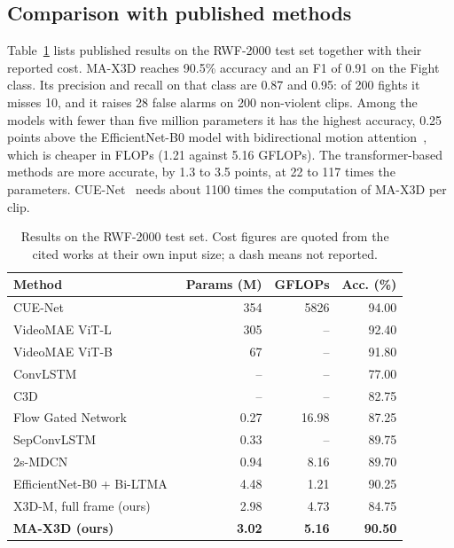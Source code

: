 \documentclass[conference]{IEEEtran}
\newif\ifdraft \drafttrue
\newcommand{\res}[1]{\ifdraft{\color{red}#1}\else#1\fi}
\begin{document}
\subsection{Comparison with published methods}

Table~\ref{tab:sota} lists published results on the RWF-2000 test set
together with their reported cost. MA-X3D reaches \res{90.5\%} accuracy
and an F1 of \res{0.91} on the Fight class. Its precision and recall on
that class are \res{0.87} and \res{0.95}: of 200 fights it misses
\res{10}, and it raises \res{28} false alarms on 200 non-violent clips.
Among the models with fewer than five million parameters it has the
highest accuracy, \res{0.25} points above the EfficientNet-B0 model with
bidirectional motion attention~\cite{biltma}, which is cheaper in FLOPs
(1.21 against 5.16 GFLOPs). The transformer-based methods are more
accurate, by \res{1.3} to \res{3.5} points, at 22 to 117 times the
parameters. CUE-Net~\cite{cuenet} needs about 1100 times the
computation of MA-X3D per clip.

\begin{table}[t]
  \caption{Results on the RWF-2000 test set. Cost figures are quoted
  from the cited works at their own input size; a dash means not
  reported.}
  \label{tab:sota}
  \centering
  \small
  \setlength{\tabcolsep}{4pt}
  \begin{tabular}{lrrr}
    \toprule
    Method & Params (M) & GFLOPs & Acc. (\%) \\
    \midrule
    CUE-Net~\cite{cuenet}              & 354  & 5826  & 94.00 \\
    VideoMAE ViT-L~\cite{videomae,mixvit} & 305 & --  & 92.40 \\
    VideoMAE ViT-B~\cite{videomae,mixvit} & 67  & --  & 91.80 \\
    \midrule
    ConvLSTM~\cite{convlstm}           & --   & --    & 77.00 \\
    C3D~\cite{c3d}                     & --   & --    & 82.75 \\
    Flow Gated Network~\cite{rwf2000}  & 0.27 & 16.98 & 87.25 \\
    SepConvLSTM~\cite{sepconvlstm}     & 0.33 & --    & 89.75 \\
    2s-MDCN~\cite{mdcn}                & 0.94 & 8.16  & 89.70 \\
    EfficientNet-B0 + Bi-LTMA~\cite{biltma} & 4.48 & 1.21 & 90.25 \\
    X3D-M, full frame (ours)           & 2.98 & 4.73  & \res{84.75} \\
    \textbf{MA-X3D (ours)}             & \textbf{3.02} & \textbf{5.16} & \textbf{\res{90.50}} \\
    \bottomrule
  \end{tabular}
\end{table}
\end{document}
